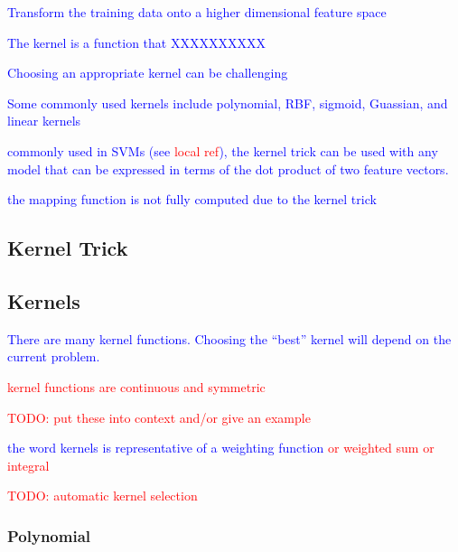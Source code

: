 \textcolor{blue}{Transform the training data onto a higher dimensional feature space}


\textcolor{blue}{The kernel is a function that XXXXXXXXXX}

\textcolor{blue}{Choosing an appropriate kernel can be challenging}


\textcolor{blue}{Some commonly used kernels include polynomial, RBF, sigmoid, Guassian, and linear kernels}

\textcolor{blue}{commonly used in SVMs (see \textcolor{red}{local ref}), the kernel trick can be used with any model that can be expressed in terms of the dot product of two feature vectors.}

\textcolor{blue}{the mapping function is not fully computed due to the kernel trick}

\subsection{Kernel Trick}

\subsection{Kernels}

\textcolor{blue}{There are many kernel functions. Choosing the ``best'' kernel will depend on the current problem.}

\textcolor{red}{kernel functions are continuous and symmetric}

\textcolor{red}{TODO: put these into context and/or give an example}

\textcolor{blue}{the word kernels is representative of a weighting function \textcolor{red}{or weighted sum or integral}}



\textcolor{red}{TODO: automatic kernel selection}

\subsubsection{Polynomial}

